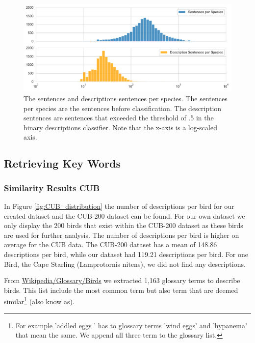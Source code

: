 \documentclass[a4paper, 12pt, oneside]{book} %
\begin{document}
\begin{figure}[h!]
 \centering
 \includegraphics[width=\textwidth]{figures/text_distribution.pdf}
 \caption[The sentences and descriptions sentences per species]{The sentences and descriptions sentences per species. The sentences per species are the sentences before classification. The description sentences are sentences that exceeded the threshold of .5 in the binary descriptions classifier. Note that the x-axis is a log-scaled axis.}
 \label{fig:text_distribution}
\end{figure}

\subsection{Retrieving Key Words}
\subsubsection{Similarity Results CUB}
In Figure \ref{fig:CUB_distribution} the number of descriptions per bird for our created dataset and the CUB-200 dataset can be found.
For our own dataset we only display the 200 birds that exist within the CUB-200 dataset as these birds are used for further analysis.
The number of descriptions per bird is higher on average for the CUB data.
The CUB-200 dataset has a mean of 148.86 descriptions per bird, while our dataset had 119.21 descriptions per bird.
For one Bird, the Cape Starling (Lamprotornis nitens), we did not find any descriptions.

From \href{https://en.wikipedia.org/wiki/Glossary_of_bird_terms}{Wikipedia/Glossary/Birds} we extracted 1,163 glossary terms to describe birds.
This list include the most common term but also term that are deemed similar\footnote{For example 'addled eggs ' has to glossary terms 'wind eggs' and 'hypanema' that mean the same. We append all three term to the glossary list.} (also know as).
\end{document}
